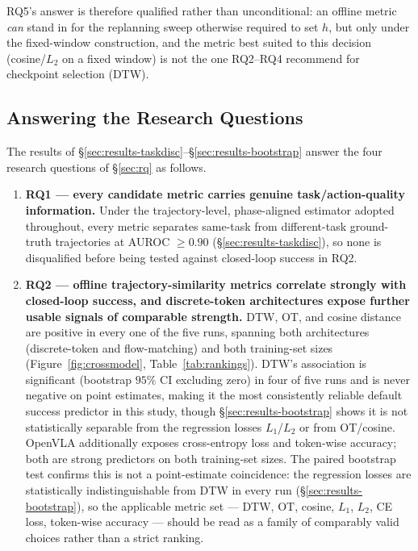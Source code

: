 \documentclass[english,12pt,a4paper,pdftex,elec,utf8]{aaltothesis}
\begin{document}
RQ5's answer is therefore qualified rather than unconditional: an offline metric \emph{can} stand in for the replanning sweep otherwise required to set $h$, but only under the fixed-window construction, and the metric best suited to this decision (cosine/$L_2$ on a fixed window) is not the one RQ2--RQ4 recommend for checkpoint selection (DTW).

\subsection{Answering the Research Questions}
\label{sec:results-conclusions}

The results of \S\ref{sec:results-taskdisc}--\S\ref{sec:results-bootstrap} answer the four research questions of \S\ref{sec:rq} as follows.

\begin{enumerate}
  \item \textbf{RQ1 --- every candidate metric carries genuine task/action-quality information.}
    \label{conc:taskdisc}
    Under the trajectory-level, phase-aligned estimator adopted throughout, every metric separates same-task from different-task ground-truth trajectories at AUROC $\ge0.90$ (\S\ref{sec:results-taskdisc}), so none is disqualified before being tested against closed-loop success in RQ2.

  \item \textbf{RQ2 --- offline trajectory-similarity metrics correlate strongly with closed-loop success, and discrete-token architectures expose further usable signals of comparable strength.}
    \label{conc:correlation}
    DTW, OT, and cosine distance are positive in every one of the five runs, spanning both
    architectures (discrete-token and flow-matching) and both training-set sizes (Figure~\ref{fig:crossmodel}, Table~\ref{tab:rankings}). DTW's association is significant (bootstrap $95\%$ CI excluding zero) in four of five runs and is never negative on point estimates, making it the most consistently reliable default success predictor in this study, though \S\ref{sec:results-bootstrap} shows it is not statistically separable from the regression losses $L_1$/$L_2$ or from OT/cosine.
    \label{conc:signals}
    OpenVLA additionally exposes cross-entropy loss and token-wise accuracy; both are strong predictors on both training-set sizes. The paired bootstrap test confirms this is not a point-estimate coincidence: the regression losses are statistically indistinguishable from DTW in every run (\S\ref{sec:results-bootstrap}), so the applicable metric set --- DTW, OT, cosine, $L_1$, $L_2$, CE loss, token-wise accuracy --- should be read as a family of comparably valid choices rather than a strict ranking.


\end{enumerate}
\end{document}
